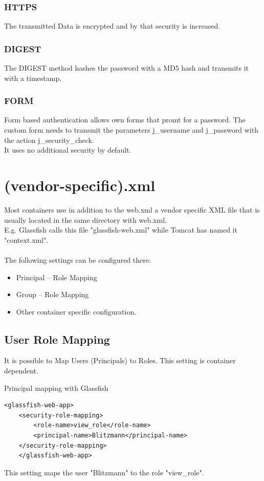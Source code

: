 \documentclass[12pt,a4paper]{report}
\begin{document}
\subsubsection*{HTTPS}
The transmitted Data is encrypted and by that security is increased.
\subsubsection*{DIGEST}
The DIGEST method hashes the password with a MD5 hash and transmits it with a timestamp.
\subsubsection*{FORM}
Form based authentication allows own forms that promt for a password. The custom form needs to transmit the parameters j\_username and j\_password with the action j\_security\_check.\\
It uses no additional security by default.
\section{(vendor-specific).xml}
Most containers use in addition to the web.xml a vendor specific XML file that is usually located in the same directory with web.xml.\\
E.g. Glassfish calls this file "glassfish-web.xml" while Tomcat has named it "context.xml".\\\\
The following settings can be configured there:\\
\begin{itemize}
	\item Principal – Role Mapping
	\item Group – Role Mapping
	\item Other container specific configuration.
\end{itemize}

\subsection{User Role Mapping}
It is possible to Map Users (Principals) to Roles. This setting is container dependent.\\
\begin{bclogo}[couleur=yellow!15,arrondi=0.1,logo=\bccrayon, ombre = true]{Principal mapping with Glassfish}
	\begin{lstlisting}[style=XML]
	<glassfish-web-app>
	<security-role-mapping>
		<role-name>view_role</role-name>
		<principal-name>Blitzmann</principal-name>
	</security-role-mapping>
	</glassfish-web-app>
	\end{lstlisting}
\end{bclogo}
This setting maps the user "Blitzmann" to the role "view\_role".
\end{document}
